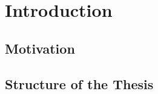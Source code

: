 \chapter{Introduction}
\label{ch:introduction}

\section{Motivation}
\label{sec:motivation}

\section{Structure of the Thesis}
\label{sec:structure}

